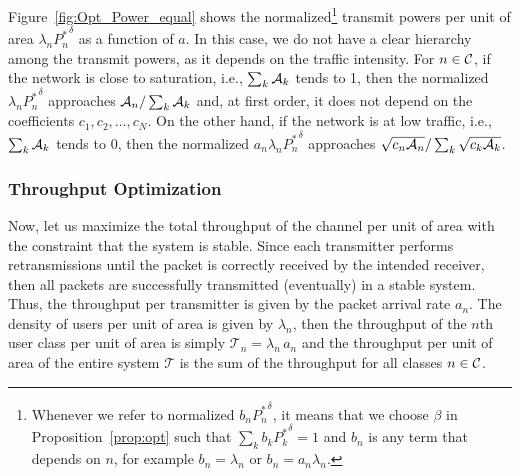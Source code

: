 Figure~\ref{fig:Opt_Power_equal} shows the normalized\footnote{Whenever we refer to normalized $b_n {P_n^*}^\delta$, it means that we choose $\beta$ in Proposition~\ref{prop:opt} such that $\sum_k b_k {P_k^*}^\delta = 1$ and $b_n$ is any term that depends on $n$, for example $b_n = \lambda_n$ or $b_n = a_n \lambda_n$.} transmit powers per unit of area $\lambda_n {P_n^*}^\delta$ as a function of $a$. In this case, we do not have a clear hierarchy among the transmit powers, as it depends on the traffic intensity. For $n\in\cal{C}$, if the network is close to saturation, i.e., $\sum_k\cal{A}_k$ tends to 1, then the normalized $\lambda_n {P_n^*}^\delta$ approaches $\cal{A}_n/\sum_k\cal{A}_k$ and, at first order, it does not depend on the coefficients $c_1, c_2, \dots, c_N$. On the other hand, if the network is at low traffic, i.e., $\sum_k\cal{A}_k$ tends to 0, then the normalized $a_n \lambda_n {P_n^*}^\delta$ approaches $\sqrt{c_n\cal{A}_n}/\sum_k\sqrt{c_k\cal{A}_k}$.

\subsubsection{Throughput Optimization}

Now, let us maximize the total throughput of the channel per unit of area with the constraint that the system is stable.
%
Since each transmitter performs retransmissions until the packet is correctly received by the intended receiver, then all packets are successfully transmitted (eventually) in a stable system. Thus, the throughput per transmitter is given by the packet arrival rate $a_n$.
%
The density of users per unit of area is given by $\lambda_n$, then the throughput of the $n$th user class per unit of area is simply $\mathscr{T}_n = \lambda_n\,a_n$ and the throughput per unit of area of the entire system $\mathscr{T}$ is the sum of the throughput for all classes $n\in\cal{C}$.

